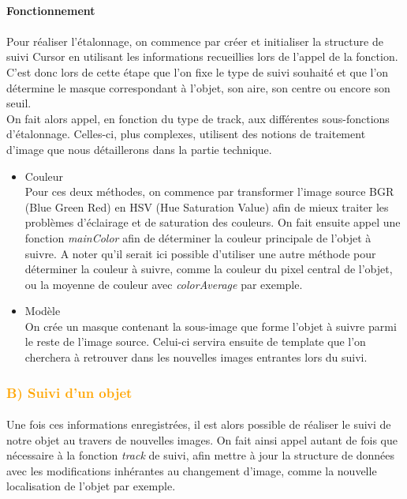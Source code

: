 \documentclass{report}
\begin{document}
					\paragraph{Fonctionnement} \paragraph{}
					Pour réaliser l'étalonnage, on commence par créer et initialiser la structure de suivi Cursor en utilisant les informations recueillies lors de l'appel de la fonction. C'est donc lors de cette étape que l'on fixe le type de suivi souhaité et que l'on détermine le masque correspondant à l'objet, son aire, son centre ou encore son seuil.\\
					On fait alors appel, en fonction du type de track, aux différentes sous-fonctions d'étalonnage. Celles-ci, plus complexes, utilisent des notions de traitement d'image que nous détaillerons dans la partie technique.\\
					\begin{itemize}
						\item{\textcolor{vert}{Couleur}}\\
						Pour ces deux méthodes, on commence par transformer l'image source BGR (Blue Green Red) en HSV (Hue Saturation Value) afin de mieux traiter les problèmes d'éclairage et de saturation des couleurs. On fait ensuite appel une fonction \textit{mainColor} afin de déterminer la couleur principale de l'objet à suivre. A noter qu'il serait ici possible d'utiliser une autre méthode pour déterminer la couleur à suivre, comme la couleur du pixel central de l'objet, ou la moyenne de couleur avec \textit{colorAverage} par exemple.
						\\\item{\textcolor{marron}{Modèle}}\\
						On crée un masque contenant la sous-image que forme l'objet à suivre parmi le reste de l'image source. Celui-ci servira ensuite de template que l'on cherchera à retrouver dans les nouvelles images entrantes lors du suivi.
					\end{itemize}
					\newpage
				\subsubsection{\textcolor{orange}{B) Suivi d'un objet}} \paragraph{}
				Une fois ces informations enregistrées, il est alors possible de réaliser le suivi de notre objet au travers de nouvelles images. On fait ainsi appel autant de fois que nécessaire à la fonction \textit{track} de suivi, afin mettre à jour la structure de données avec les modifications inhérantes au changement d'image, comme la nouvelle localisation de l'objet par exemple.
\end{document}
